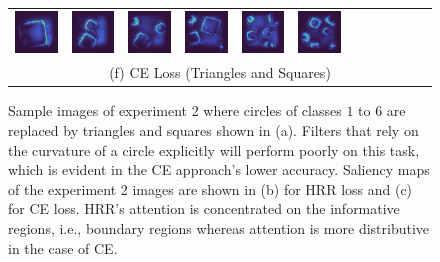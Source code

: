 \documentclass[letterpaper]{article} %
\begin{document}
\begin{figure}[!htbp]
\begin{tabular}{cccccccccccc}
\multicolumn{1}{c}{\includegraphics[width=0.125\columnwidth]{saliency/ce/circle/square_1.png}} \hspace{-12pt} &  \multicolumn{1}{c}{\includegraphics[width=0.125\columnwidth]{saliency/ce/circle/square_2.png}} \hspace{-12pt} & \multicolumn{1}{c}{\includegraphics[width=0.125\columnwidth]{saliency/ce/circle/square_3.png}} \hspace{-12pt} & \multicolumn{1}{c}{\includegraphics[width=0.125\columnwidth]{saliency/ce/circle/square_4.png}} \hspace{-12pt} & \multicolumn{1}{c}{\includegraphics[width=0.125\columnwidth]{saliency/ce/circle/square_5.png}} \hspace{-12pt} & \multicolumn{1}{c}{\includegraphics[width=0.125\columnwidth]{saliency/ce/circle/square_6.png}} \\ 
\multicolumn{12}{c}{(f) CE Loss (Triangles and Squares)}
\end{tabular}
\caption{Sample images of experiment 2 where circles of classes $1$ to $6$ are replaced by triangles and squares shown in (a). Filters that rely on the curvature of a circle explicitly will perform poorly on this task, which is evident in the CE approach's lower accuracy. Saliency maps of the experiment 2 images are shown in (b) for HRR loss and (c) for CE loss. HRR’s attention is concentrated on the informative regions, i.e., boundary regions whereas attention is more distributive in the case of CE.}
\label{fig:exp_2_saliency}
\end{figure}
\end{document}
